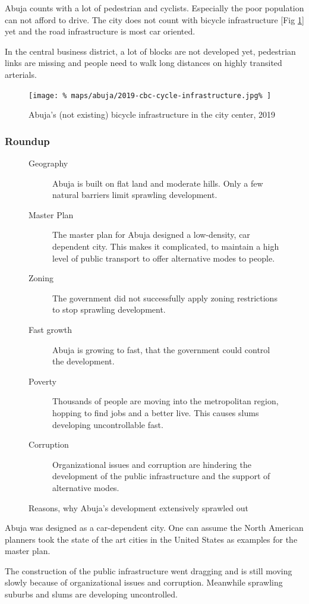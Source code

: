 \documentclass{article}
\begin{document}
\begin{multicols}{2}
			Abuja counts with a lot of pedestrian and cyclists. Especially the poor population can not afford to drive.
			The city does not count with bicycle infrastructure [Fig \ref{fig:map:abuja-bicycle-map-2019}] yet and the road infrastructure is most car oriented.
			
			In the central business district, a lot of blocks are not developed yet, pedestrian links are missing and people need to walk long distances on highly transited arterials.
			
			\begin{figure}[H]
				\texttt{[image: \%
					maps/abuja/2019-cbc-cycle-infrastructure.jpg\%
				]}
				\caption{Abuja's (not existing) bicycle infrastructure in the city center, 2019 \cite{OpenCycleMap:Abuja}}
				\label{fig:map:abuja-bicycle-map-2019}
			\end{figure}	
			
			
			\subsubsection{Roundup}
			
			\begin{figure}[H]
				\begin{description}
					\item [Geography] Abuja is built on flat land and moderate hills. Only a few natural barriers limit sprawling development.
					\item [Master Plan] The master plan for Abuja designed a low-density, car dependent city. This makes it complicated, to maintain a high level of public transport to offer alternative modes to people.
					\item [Zoning] The government did not successfully apply zoning restrictions to stop sprawling development.
					\item [Fast growth] Abuja is growing to fast, that the government could control the development.
					\item [Poverty] Thousands of people are moving into the metropolitan region, hopping to find jobs and a better live. This causes slums developing uncontrollable fast.
					\item [Corruption] Organizational issues and corruption are hindering the development of the public infrastructure and the support of alternative modes.
				\end{description}
				\caption{Reasons, why Abuja's development extensively sprawled out}
				\label{fig:list:abuja-development-reasons}
			\end{figure}
			
			Abuja was designed as a car-dependent city. One can assume the North American planners took the state of the art cities in the United States as examples for the master plan.
			
			The construction of the public infrastructure went dragging and is still moving slowly because of organizational issues and corruption. Meanwhile sprawling suburbs and slums are developing uncontrolled.
	\end{multicols}
			
\end{document}
